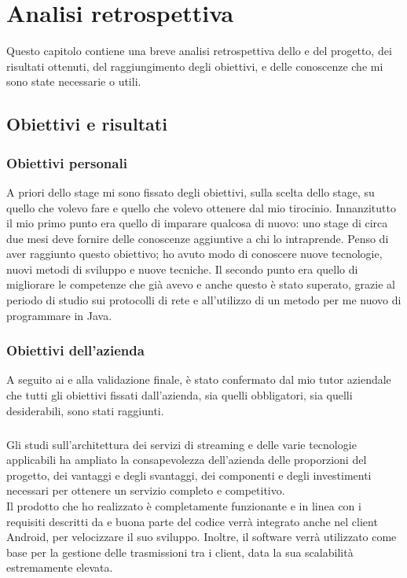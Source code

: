 \chapter{Analisi retrospettiva}
Questo capitolo contiene una breve analisi retrospettiva dello  e del progetto, dei risultati ottenuti, del raggiungimento degli obiettivi, e delle conoscenze che mi sono state necessarie o utili.

\section{Obiettivi e risultati}
\subsection{Obiettivi personali}
A priori dello stage mi sono fissato degli obiettivi, sulla scelta dello stage, su quello che volevo fare e quello che volevo ottenere dal mio tirocinio. Innanzitutto il mio primo punto era quello di imparare qualcosa di nuovo: uno stage di circa due mesi deve fornire delle conoscenze aggiuntive a chi lo intraprende. Penso di aver raggiunto questo obiettivo; ho avuto modo di conoscere nuove tecnologie, nuovi metodi di sviluppo e nuove tecniche. Il secondo punto era quello di migliorare le competenze che già avevo e anche questo è stato superato, grazie al periodo di studio sui protocolli di rete e all'utilizzo di un metodo per me nuovo di programmare in Java.

\subsection{Obiettivi dell'azienda}
A seguito ai  e alla validazione finale, è stato confermato dal mio tutor aziendale che tutti gli obiettivi fissati dall'azienda, sia quelli obbligatori, sia quelli desiderabili, sono stati raggiunti.
\paragraph*{} Gli studi sull'architettura dei servizi di streaming e delle varie tecnologie applicabili ha ampliato la consapevolezza dell'azienda delle proporzioni del progetto, dei vantaggi e degli svantaggi, dei componenti e degli investimenti necessari per ottenere un servizio completo e competitivo.
\\
Il prodotto che ho realizzato è completamente funzionante e in linea con i requisiti descritti da \nomeAzienda{} e buona parte del codice verrà integrato anche nel client Android, per velocizzare il suo sviluppo. Inoltre, il software verrà utilizzato come base per la gestione delle trasmissioni tra i client, data la sua scalabilità estremamente elevata.

